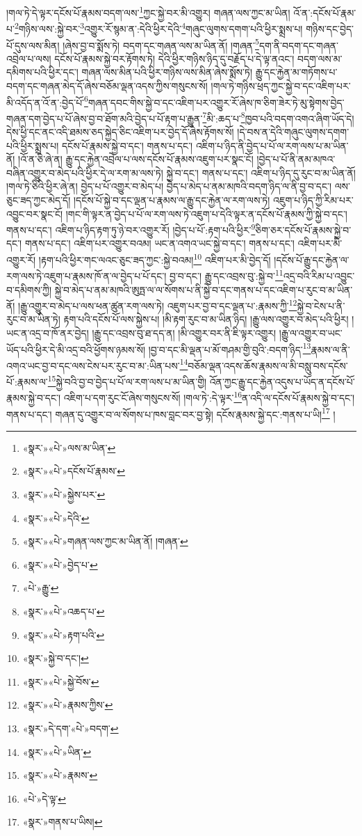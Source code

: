 །གལ་ཏེ་དེ་ལྟར་དངོས་པོ་རྣམས་བདག་ལས་\footnote{«སྣར་»«པེ་»ལས་མ་ཡིན་}ཀྱང་སྐྱེ་བར་མི་འགྱུར། གཞན་ལས་ཀྱང་མ་ཡིན། འོ་ན་:དངོས་པོ་རྣམ་པ་\footnote{«སྣར་»«པེ་»དངོས་པོ་རྣམས་}གཉིས་ལས་:སྐྱེ་བར་\footnote{«སྣར་»«པེ་»སྐྱེས་པར་}འགྱུར་རོ་སྙམ་ན་:དེའི་ཕྱིར་དེའི་\footnote{«སྣར་»«པེ་»དེའི་}གཞུང་ལུགས་དགག་པའི་ཕྱིར་སྨྲས་པ། གཉིས་དང་བྱེད་པོ་དུས་ལས་མིན། །ཞེས་བྱ་བ་སྨོས་ཏེ། བདག་དང་གཞན་ལས་མ་ཡིན་ནོ། །གཞན་\footnote{«སྣར་»«པེ་»གཞན་ལས་ཀྱང་མ་ཡིན་ནོ། །གཞན་}དག་ནི་བདག་དང་གཞན་འབྲེལ་པ་ལས། དངོས་པོ་རྣམས་སྐྱེ་བར་རྟོགས་ཏེ། དེའི་ཕྱིར་གཉིས་ཉིད་དུ་བརྗོད་པ་དེ་ལྟ་ནའང་། བདག་ལས་མ་དམིགས་པའི་ཕྱིར་དང་། གཞན་ལས་མིན་པའི་ཕྱིར་གཉིས་ལས་མིན་ཞེས་སྨོས་ཏེ། རྒྱུ་དང་རྐྱེན་མ་གཏོགས་པ་བདག་དང་གཞན་མེད་དོ་ཞེས་བཅོམ་ལྡན་འདས་ཀྱིས་གསུངས་སོ། །གལ་ཏེ་གཉིས་ཕྲད་ཀྱང་སྐྱེ་བ་དང་འཇིག་པར་མི་འདོད་ན་འོ་ན་:བྱེད་པོ་\footnote{«སྣར་»«པེ་»བྱེད་པ་}གཞན་དབང་གིས་སྐྱེ་བ་དང་འཇིག་པར་འགྱུར་རོ་ཞེས་ཁ་ཅིག་ཟེར་ཏེ་མུ་སྟེགས་བྱེད་གཞན་དག་བྱེད་པ་པོ་ཞེས་བྱ་བ་ཐོག་མའི་བྱེད་པ་པོ་རྟག་པ་རྒྱུན་\footnote{«པེ་»རྒྱུ་}མི་:ཆད་པ་\footnote{«སྣར་»«པེ་»འཆད་པ་}ཁྱབ་པའི་བདག་འགའ་ཞིག་ཡོད་དེ། དེས་ཕྱི་དང་ནང་འདི་ཐམས་ཅད་སྐྱེད་ཅིང་འཇིག་པར་བྱེད་དོ་ཞེས་རྟོགས་སོ། །དེ་བས་ན་དེའི་གཞུང་ལུགས་དགག་པའི་ཕྱིར་སྨྲས་པ། དངོས་པོ་རྣམས་སྐྱེ་བ་དང་། གནས་པ་དང་། འཇིག་པ་ཉིད་ནི་བྱེད་པ་པོ་ལ་རག་ལས་པ་མ་ཡིན་ནོ། །འོ་ན་ཅི་ཞེ་ན། རྒྱུ་དང་རྐྱེན་འབྲེལ་པ་ལས་དངོས་པོ་རྣམས་འཇུག་པར་སྣང་ངོ། །བྱེད་པ་པོ་ནི་ནམ་མཁའ་བཞིན་འགྱུར་བ་མེད་པའི་ཕྱིར་དེ་ལ་རག་མ་ལས་ཏེ། སྐྱེ་བ་དང་། གནས་པ་དང་། འཇིག་པ་ཉིད་དུ་རུང་བ་མ་ཡིན་ནོ། །གལ་ཏེ་ཅིའི་ཕྱིར་ཞེ་ན། བྱེད་པ་པོ་འགྱུར་བ་མེད་པ། བྱེད་པ་མེད་པ་ནམ་མཁའི་བདག་ཉིད་ལ་ནི་བྱ་བ་དང་། ལས་ཅུང་ཟད་ཀྱང་མེད་དོ། །དངོས་པོ་སྐྱེ་བ་དང་ལྡན་པ་རྣམས་ལ་རྒྱུ་དང་རྐྱེན་ལ་རག་ལས་ཏེ། འཇུག་པ་ཉིད་ཀྱི་རིམ་པར་འབྱུང་བར་སྣང་ངོ། །གང་གི་ལྟར་ན་བྱེད་པ་པོ་ལ་རག་ལས་ཏེ་འཇུག་པ་དེའི་ལྟར་ན་དངོས་པོ་རྣམས་ཀྱི་སྐྱེ་བ་དང་། གནས་པ་དང་། འཇིག་པ་ཉིད་རྟག་ཏུ་ཉེ་བར་འགྱུར་རོ། །བྱེད་པ་པོ་:རྟག་པའི་ཕྱིར་\footnote{«སྣར་»«པེ་»རྟག་པའི་}ཅིག་ཅར་དངོས་པོ་རྣམས་སྐྱེ་བ་དང་། གནས་པ་དང་། འཇིག་པར་འགྱུར་བའམ། ཡང་ན་འགའ་ཡང་སྐྱེ་བ་དང་། གནས་པ་དང་། འཇིག་པར་མི་འགྱུར་རོ། །རྟག་པའི་ཕྱིར་གང་ལའང་ཅུང་ཟད་ཀྱང་:སྐྱེ་བའམ།\footnote{«སྣར་»སྐྱེ་བ་དང་།} འཇིག་པར་མི་བྱེད་དོ། །དངོས་པོ་རྒྱུ་དང་རྐྱེན་ལ་རག་ལས་ཏེ་འཇུག་པ་རྣམས་ཁོ་ན་ལ་བྱེད་པ་པོ་དང་། བྱ་བ་དང་། རྒྱུ་དང་འབྲས་བུ་:སྐྱེ་བ་\footnote{«སྣར་»«པེ་»སྐྱེ་བོས་}འདྲ་བའི་རིམ་པ་འབྱུང་བ་དམིགས་ཀྱི། སྐྱེ་བ་མེད་པ་ནམ་མཁའི་ཨུཏྤ་ལ་ལ་སོགས་པ་ནི་སྐྱེ་བ་དང་གནས་པ་དང་འཇིག་པ་རུང་བ་མ་ཡིན་ནོ། །རྒྱུ་འགྱུར་བ་མེད་པ་ལས་ཕན་ཚུན་རག་ལས་ཏེ། འཇུག་པར་བྱ་བ་དང་ལྡན་པ་:རྣམས་ཀྱི་\footnote{«སྣར་»«པེ་»རྣམས་ཀྱིས་}སྐྱེ་བ་ངེས་པ་ནི་རུང་བ་མ་ཡིན་ཏེ། རྟག་པའི་དངོས་པོ་ལས་སྐྱེས་པ། །མི་རྟག་རུང་བ་མ་ཡིན་ཉིད། །རྒྱུ་ལས་འགྱུར་བ་མེད་པའི་ཕྱིར། །ཡང་ན་འདྲ་བ་ཁོ་ནར་བྱེད། །རྒྱུ་དང་འབྲས་བུ་ཐ་དད་ན། །མི་འགྱུར་བར་ནི་ཇི་ལྟར་འགྱུར། །རྒྱུ་ལ་འགྱུར་བ་ཡང་ཡོད་པའི་ཕྱིར་དེ་མི་འདྲ་བའི་ཕྱོགས་ཉམས་སོ། །བྱ་བ་དང་མི་ལྡན་པ་མོ་གཤམ་གྱི་བུའི་:བདག་ཉིད་\footnote{«སྣར་»དེ་དག་«པེ་»བདག་}རྣམས་ལ་ནི་འགའ་ཡང་བྱ་བ་དང་ལས་ངེས་པར་རུང་བ་མ་:ཡིན་པས་\footnote{«སྣར་»«པེ་»ཡིན་}བཅོམ་ལྡན་འདས་ཆོས་རྣམས་ལ་མི་བསླུ་བས་དངོས་པོ་:རྣམས་ལ་\footnote{«སྣར་»«པེ་»རྣམས་}སྐྱེ་བའི་བྱ་བ་བྱེད་པ་པོ་ལ་རག་ལས་པ་མ་ཡིན་གྱི། འོན་ཀྱང་རྒྱུ་དང་རྐྱེན་འདུས་པ་ཡོད་ན་དངོས་པོ་རྣམས་སྐྱེ་བ་དང་། འཇིག་པ་དག་རུང་ངོ་ཞེས་གསུངས་སོ། །གལ་ཏེ་:དེ་ལྟར་\footnote{«པེ་»དེ་ལྟ་}ན་འདི་ལ་དངོས་པོ་རྣམས་སྐྱེ་བ་དང་། གནས་པ་དང་། གཞན་དུ་འགྱུར་བ་ལ་སོགས་པ་ཁས་བླང་བར་བྱ་སྟེ། དངོས་རྣམས་སྐྱེ་དང་:གནས་པ་ཡི།\footnote{«སྣར་»གནས་པ་ཡིས།} །
